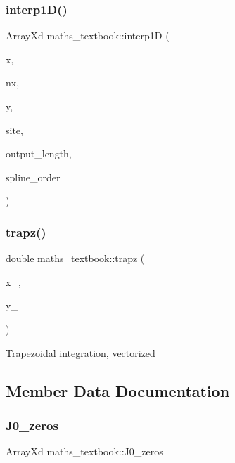 \subsubsection{\texorpdfstring{interp1\+D()}{interp1D()}\hspace{0.1cm}{\footnotesize\ttfamily [2/2]}}
{\footnotesize\ttfamily Array\+Xd maths\+\_\+textbook\+::interp1D (\begin{DoxyParamCaption}\item[{Array\+Xd}]{x,  }\item[{int}]{nx,  }\item[{Array\+Xd}]{y,  }\item[{Array\+Xd}]{site,  }\item[{int}]{output\+\_\+length,  }\item[{int}]{spline\+\_\+order }\end{DoxyParamCaption})}

\mbox{\label{classmaths__textbook_a158ce9c89ee1db5495810c25ee2aed57}} 
\subsubsection{\texorpdfstring{trapz()}{trapz()}}
{\footnotesize\ttfamily double maths\+\_\+textbook\+::trapz (\begin{DoxyParamCaption}\item[{Array\+Xd}]{x\+\_\+,  }\item[{Array\+Xd}]{y\+\_\+ }\end{DoxyParamCaption})}

Trapezoidal integration, vectorized 

\subsection{Member Data Documentation}
\mbox{\label{classmaths__textbook_a41398eada5e3eb88fb64d044c14aed26}} 
\subsubsection{\texorpdfstring{J0\+\_\+zeros}{J0\_zeros}}
{\footnotesize\ttfamily Array\+Xd maths\+\_\+textbook\+::\+J0\+\_\+zeros}

